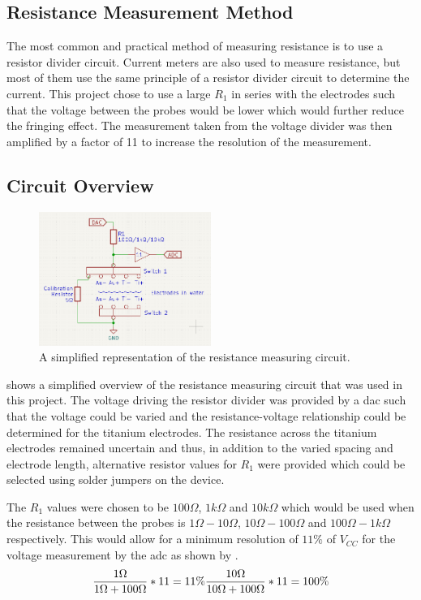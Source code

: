 \subsection{Resistance Measurement Method}

The most common and practical method of measuring resistance is to use a resistor divider circuit.
Current meters are also used to measure resistance, but most of them use the same principle of a resistor divider circuit to determine the current.
This project chose to use a large $R_1$ in series with the electrodes such that the voltage between the probes would be lower which would further reduce the fringing effect.
The measurement taken from the voltage divider was then amplified by a factor of 11 to increase the resolution of the measurement.

\subsection{Circuit Overview}

\begin{figure}
    \centering
    \includegraphics[width=0.5\textwidth]{Figures/CircuitOverview}
    \caption{A simplified representation of the resistance measuring circuit.}
    \label{fig:circuit-overview} %
\end{figure}

 shows a simplified overview of the resistance measuring circuit that was used in this project.
The voltage driving the resistor divider was provided by a \gls{dac} such that the voltage could be varied and the resistance-voltage relationship could be determined for the titanium electrodes.
The resistance across the titanium electrodes remained uncertain and thus, in addition to the varied spacing and electrode length, alternative resistor values for $R_1$ were provided which could be selected using solder jumpers on the device.

The $R_1$ values were chosen to be $100\Omega$, $1k\Omega$ and $10k\Omega$ which would be used when the resistance between the probes is $1\Omega - 10\Omega$, $10\Omega - 100\Omega$ and $100\Omega - 1k\Omega$ respectively.
This would allow for a minimum resolution of $11\%$ of $V_{CC}$ for the voltage measurement by the \gls{adc} as shown by .
\begin{equation}\label{eqn:adc-resolution}
    \frac{\displaystyle 1\Omega}{\displaystyle 1\Omega + 100\Omega} * 11 = 11\%
    \frac{\displaystyle 10\Omega}{\displaystyle 10\Omega + 100\Omega} * 11 = 100\%
\end{equation} 

